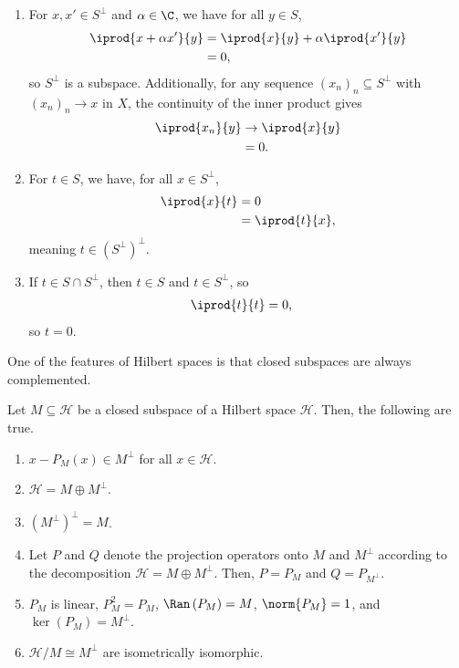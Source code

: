 \documentclass[10pt]{mypackage}
\begin{document}
\begin{solution}\hfill
  \begin{enumerate}[(1)]
    \item For $x,x'\in S^{\perp}$ and $\alpha \in \C$, we have for all $y\in S$,
      \begin{align*}
        \iprod{x + \alpha x'}{y} &= \iprod{x}{y} + \alpha \iprod{x'}{y}\\
                                 &= 0,
      \end{align*}
      so $S^{\perp}$ is a subspace. Additionally, for any sequence $\left(x_n\right)_n\subseteq S^{\perp}$ with $\left(x_n\right)_n\rightarrow x$ in $X$, the continuity of the inner product gives
      \begin{align*}
        \iprod{x_n}{y} &\rightarrow \iprod{x}{y}\\
                       &= 0.
      \end{align*}
    \item For $t\in S$, we have, for all $x\in S^{\perp}$,
      \begin{align*}
        \iprod{x}{t} &= 0\\
                     &= \iprod{t}{x},
      \end{align*}
      meaning $t \in \left(S^{\perp}\right)^{\perp}$.
    \item If $t\in S\cap S^{\perp}$, then $t\in S$ and $t\in S^{\perp}$, so
      \begin{align*}
        \iprod{t}{t} &= 0,
      \end{align*}
      so $t = 0$.
  \end{enumerate}
\end{solution}
One of the features of Hilbert spaces is that closed subspaces are always complemented. 
\begin{theorem}
  Let $M\subseteq \mathcal{H}$ be a closed subspace of a Hilbert space $\mathcal{H}$. Then, the following are true.
  \begin{enumerate}[(1)]
    \item $x-P_M\left(x\right)\in M^{\perp}$ for all $x\in \mathcal{H}$.
    \item $\mathcal{H} = M\oplus M^{\perp}$.
    \item $\left(M^{\perp}\right)^{\perp} = M$.
    \item Let $P$ and $Q$ denote the projection operators onto $M$ and $M^{\perp}$ according to the decomposition $\mathcal{H} = M\oplus M^{\perp}$. Then, $P = P_M$ and $Q = P_{M^{\perp}}$.
    \item $P_M$ is linear, $P_M^2 = P_M$, $\Ran\left(P_M\right) = M$, $\norm{P_M} = 1$, and $\ker\left(P_M\right) = M^{\perp}$.
    \item $\mathcal{H}/M \cong M^{\perp}$ are isometrically isomorphic.
  \end{enumerate}
\end{theorem}
\end{document}
